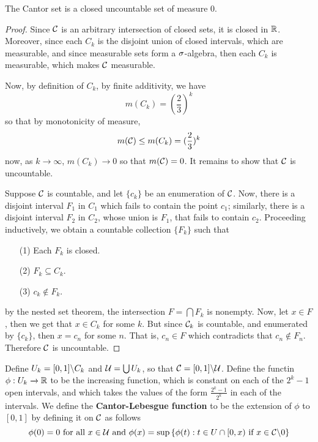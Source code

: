 \begin{theorem}\label{2.5.5}
    The Cantor set is a closed uncountable set of measure $0$.
\end{theorem}
\begin{proof}
    Since $\mathcal{C}$ is an arbitrary intersection of closed sets, it is closed in
    $\mathbb{R}$. Moreover, since each $C_k$ is the disjoint union of closed intervals,
    which are measurable, and since measurable sets form a  $\sigma$-algebra, then
    each  $C_k$ is measurable, which makes  $\mathcal{C}$ measurable.

    Now, by definition of $C_k$, by finite additivity, we have
    \begin{equation*}
        m(C_k)=(\frac{2}{3})^k
    \end{equation*}
    so that by monotonicity of measure,
    \begin{equation*}
        m(\mathcal{C}) \leq m(C_k)=(\frac{2}{3})^k
    \end{equation*}
    now, as $k \xrightarrow{} \infty$, $m(C_k) \xrightarrow{} 0$ so that
    $m(\mathcal{C})=0$. It remains to show that $\mathcal{C}$ is uncountable.

    Suppose  $\mathcal{C}$ is countable, and let $\{c_k\}$ be an enumeration of $\mathcal{C}$.
    Now, there is a disjoint interval $F_1$ in $C_1$ which fails to contain the
    point $c_1$; similarly, there is a disjoint interval $F_2$ in $C_2$, whose
    union is $F_1$, that fails to contain $c_2$. Proceeding inductively, we
    obtain a countable collection $\{F_k\}$ such that
    \begin{enumerate}
        \item[(1)] Each $F_k$ is closed.

        \item[(2)] $F_k \subseteq C_k$.

        \item[(3)] $c_k \notin F_k$.
    \end{enumerate}
    by the nested set theorem, the intersection $F=\bigcap{F_k}$ is nonempty.
    Now, let $ x \in F$, then we get that  $x \in C_k$ for some  $k$. But since
     $\mathcal{C}_k$ is countable, and enumerated by $\{c_k\}$, then $x=c_n$ for some
     $n$. That is,  $c_n \in F$ which contradicts that  $c_n \notin F_n$.
     Therefore  $\mathcal{C}$ is uncountable.
\end{proof}

\begin{definition}
    Define $U_k=[0,1]\backslash C_k$ and $\mathcal{U}=\bigcup{U_k}$, so that
    $\mathcal{C}=[0,1]\backslash\mathcal{U}$. Define the functin $\phi:U_k \xrightarrow{} \mathbb{R}$ to be
    the increasing function, which is constant on each of the $2^k-1$ open
    intervals, and which takes the values of the form $\frac{2^k-1}{2^k}$ in
    each of the intervals. We define the \textbf{Cantor-Lebesgue function} to be
    the extension of $\phi$ to $[0,1]$ by defining it on $\mathcal{C}$ as follows
    \begin{equation*}
        \phi(0)=0 \text{ for all } x \in \mathcal{U}
        \text{ and } \phi(x)=\sup{\{\phi(t) : t \in U \cap [0,x) \text{ if } x
        \in \mathcal{C}\backslash0\}}
    \end{equation*}
\end{definition}

